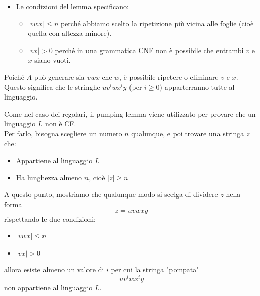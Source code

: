 \documentclass[12pt, a4paper]{report}
\begin{document}
\begin{demonstration}
\begin{itemize}
\begin{itemize}
                        \item Le condizioni del lemma specificano: \begin{itemize}
                            \item $|vwx| \leq n$ perché abbiamo scelto la ripetizione più vicina alle foglie (cioè quella con altezza minore).
                            \item $|vx| > 0$ perché in una grammatica CNF non è possibile che entrambi $v$ e $x$ siano vuoti.
                        \end{itemize}
                    \end{itemize}
                \end{itemize}
                  Poiché $A$ può generare sia $vwx$ che $w$, è possibile ripetere o eliminare $v$ e $x$. Questo significa che le stringhe $uv^iwx^iy$ (per $i \geq 0$) apparterranno tutte al linguaggio.
            \end{demonstration}
            Come nel caso dei regolari, il pumping lemma viene utilizzato per provare che un linguaggio $L$ non è CF.\\
            Per farlo, bisogna scegliere un numero $n$ qualunque, e poi trovare una stringa $z$ che: \begin{itemize}
                \item Appartiene al linguaggio $L$
                \item Ha lunghezza almeno $n$, cioè $|z|\geq n$
            \end{itemize}
            A questo punto, mostriamo che qualunque modo si scelga di dividere $z$ nella forma $$z=uvwxy$$
            rispettando le due condizioni: 
            \begin{itemize}
                \item $|vwx|\leq n$
                \item $|vx|>0$
            \end{itemize}
            allora esiste almeno un valore di $i$ per cui la stringa "pompata"
            $$uv^iwx^iy$$
            non appartiene al linguaggio $L$.
\end{document}
